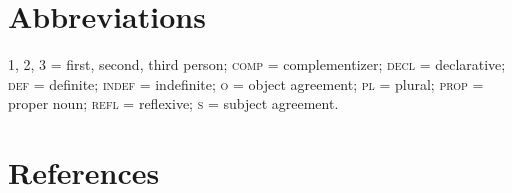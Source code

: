 \documentclass[output=paper]{LSP/langsci}
\begin{document}
\section*{Abbreviations}
1, 2, 3 = first, second, third person; \textsc{comp} = complementizer; \textsc{decl} = declarative; \textsc{def} = definite; \textsc{indef} = indefinite; \textsc{o} = object agreement; \textsc{pl} = plural; \textsc{prop} = proper noun; \textsc{refl} = reflexive; \textsc{s} = subject agreement. 

\section*{References}


\printbibliography[heading=subbibliography,notkeyword=this]
\end{document}

